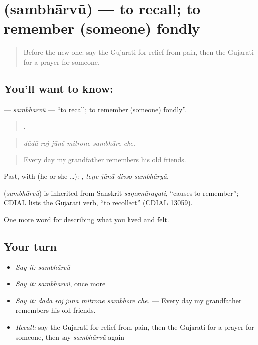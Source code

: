\section[\texorpdfstring{\gu{સંભારવું} (sambhārvũ)}{સંભારવું (sambhārvũ)}]{ (sambhārvũ) — to recall; to remember (someone) fondly}

\label{lesson:GU-C489-sambharvu}



\begin{quote}
Before the new one: say the Gujarati for relief from pain, then the Gujarati for a prayer for someone.
\end{quote}

\subsection*{You'll want to know: }
\textbf{} — \emph{sambhārvũ} — \textquotedblleft{}to recall; to remember (someone) fondly\textquotedblright{}.

\begin{quote}
     .
\end{quote}

\begin{quote}
\emph{dādā roj jūnā mitrone sambhāre che.}
\end{quote}

\begin{quote}
Every day my grandfather remembers his old friends.
\end{quote}

Past, with  (he or she …):    , \emph{teṇe jūnā divso sambhāryā}.

\begin{cousinweb}
\textbf{} (\emph{sambhārvũ}) is inherited from Sanskrit \emph{saṃsmārayati}, \textquotedblleft{}causes to remember\textquotedblright{}; CDIAL lists the Gujarati verb, \textquotedblleft{}to recollect\textquotedblright{} (CDIAL 13059).
\end{cousinweb}

\begin{grammarlens}[title={What you've built}]
One more word for describing what you lived and felt.
\end{grammarlens}

\subsection*{Your turn}
\begin{itemize}
\raggedright
  \item \emph{Say it:} \emph{sambhārvũ}
  \item \emph{Say it:} \emph{sambhārvũ}, once more
  \item \emph{Say it:} \emph{dādā roj jūnā mitrone sambhāre che.} — Every day my grandfather remembers his old friends.
  \item \emph{Recall:} say the Gujarati for relief from pain, then the Gujarati for a prayer for someone, then say \emph{sambhārvũ} again
\end{itemize}

